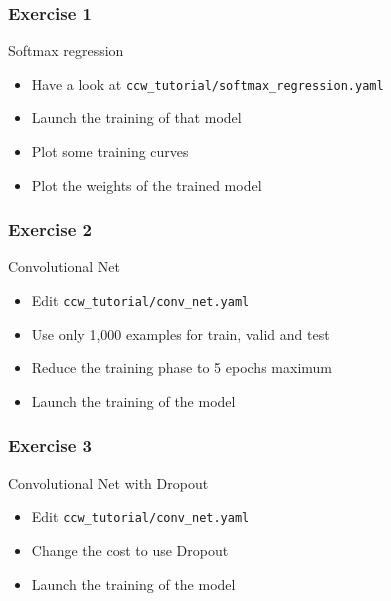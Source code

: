 \documentclass[mathserif, xcolor=dvipsnames]{beamer}
\begin{document}
\begin{frame}
    \frametitle{Exercise 1}
    \LARGE Softmax regression
    \begin{itemize}\addtolength{\itemsep}{0.5\baselineskip}
            \large
            \item{Have a look at \texttt{ccw\_tutorial/softmax\_regression.yaml}}
            \item{Launch the training of that model}
            \item{Plot some training curves}
            \item{Plot the weights of the trained model}
    \end{itemize}
\end{frame}

\begin{frame}
    \frametitle{Exercise 2}
    \LARGE Convolutional Net
    \begin{itemize}\addtolength{\itemsep}{0.5\baselineskip}
            \large
            \item{Edit \texttt{ccw\_tutorial/conv\_net.yaml}}
            \item{Use only 1,000 examples for train, valid and test}
            \item{Reduce the training phase to 5 epochs maximum}
            \item{Launch the training of the model}
    \end{itemize}
\end{frame}

\begin{frame}
    \frametitle{Exercise 3}
    \LARGE Convolutional Net with Dropout
    \begin{itemize}\addtolength{\itemsep}{0.5\baselineskip}
            \large
            \item{Edit \texttt{ccw\_tutorial/conv\_net.yaml}}
            \item{Change the cost to use Dropout}
            \item{Launch the training of the model}
    \end{itemize}
\end{frame}
\end{document}
